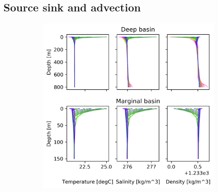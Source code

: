 \documentclass[twocolumn]{article}
\begin{document}
\subsection{Source sink and advection}
\begin{figure}
\begin{subfigure}[h]{0.7\textwidth}
\centering
\includegraphics[width=\textwidth,keepaspectratio]{SS_no_adv.png}
\end{subfigure}\hfill
\begin{subfigure}[h]{0.23\textwidth}
\centering

\end{subfigure}
\end{figure}
\end{document}
